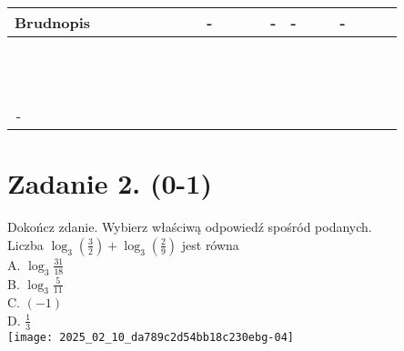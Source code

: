 \documentclass[10pt]{article}
\begin{document}
\begin{center}
\begin{tabular}{|c|c|c|c|c|c|c|c|c|c|c|c|c|c|c|c|c|c|c|c|c|c|c|c|}
\hline
\multicolumn{5}{|l|}{Brudnopis} &  &  &  &  &  &  &  & - &  &  &  & - & - &  &  & - &  &  &  \\
\hline
 &  &  &  &  &  &  &  &  &  &  &  &  &  &  &  &  &  &  &  &  &  &  &  \\
\hline
 &  &  &  &  &  &  &  &  &  &  &  &  &  &  &  &  &  &  &  &  &  &  &  \\
\hline
 &  &  &  &  &  &  &  &  &  &  &  &  &  &  &  &  &  &  &  &  &  &  &  \\
\hline
 &  &  &  &  &  &  &  &  &  &  &  &  &  &  &  &  &  &  &  &  &  &  &  \\
\hline
 &  &  &  &  &  &  &  &  &  &  &  &  &  &  &  &  &  &  &  &  &  &  &  \\
\hline
 &  &  &  &  &  &  &  &  &  &  &  &  &  &  &  &  &  &  &  &  &  &  &  \\
\hline
 &  &  &  &  &  &  &  &  &  &  &  &  &  &  &  &  &  &  &  &  &  &  &  \\
\hline
 &  &  &  &  &  &  &  &  &  &  &  &  &  &  &  &  &  &  &  &  &  &  &  \\
\hline
 &  &  &  &  &  &  &  &  &  &  &  &  &  &  &  &  &  &  &  &  &  &  &  \\
\hline
 &  &  &  &  &  &  &  &  &  &  &  &  &  &  &  &  &  &  &  &  &  &  &  \\
\hline
 &  &  &  &  &  &  &  &  &  &  &  &  &  &  &  &  &  &  &  &  &  &  &  \\
\hline
 &  &  &  &  &  &  &  &  &  &  &  &  &  &  &  &  &  &  &  &  &  &  &  \\
\hline
- &  &  &  &  &  &  &  &  &  &  &  &  &  &  &  &  &  &  &  &  &  &  &  \\
\hline
\end{tabular}
\end{center}

\section*{Zadanie 2. (0-1)}
Dokończ zdanie. Wybierz właściwą odpowiedź spośród podanych.\\
Liczba \(\log _{3}\left(\frac{3}{2}\right)+\log _{3}\left(\frac{2}{9}\right)\) jest równa\\
A. \(\log _{3} \frac{31}{18}\)\\
B. \(\log _{3} \frac{5}{11}\)\\
C. \((-1)\)\\
D. \(\frac{1}{3}\)\\
\texttt{[image: 2025\_02\_10\_da789c2d54bb18c230ebg-04]}
\end{document}
